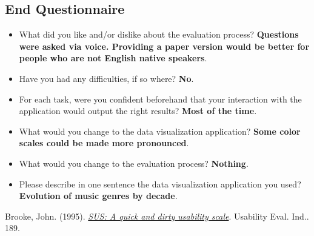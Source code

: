 \documentclass[twocolumn, letterpaper,13pt]{scrartcl}
\begin{document}
    \subsection*{End Questionnaire}
    \begin{itemize}
        \item What did you like and/or dislike about the evaluation process? \textbf{Questions were asked via voice. Providing a paper version would be better for people who are not English native speakers}.
        \item Have you had any difficulties, if so where? \textbf{No}.
        \item For each task, were you confident beforehand that your interaction with the application would output the right results? \textbf{Most of the time}.
        \item What would you change to the data visualization application? \textbf{Some color scales could be made more pronounced}. 
        \item What would you change to the evaluation process? \textbf{Nothing}.
        \item Please describe in one sentence the data visualization application you used? \textbf{Evolution of music genres by decade}.
    \end{itemize}
    
       
    \begin{thebibliography}{9}

    Brooke, John. (1995). \textit{\href{https://hell.meiert.org/core/pdf/sus.pdf}{SUS: A quick and dirty usability scale}}. Usability Eval. Ind.. 189. 

    \end{thebibliography}
    
\end{document}
